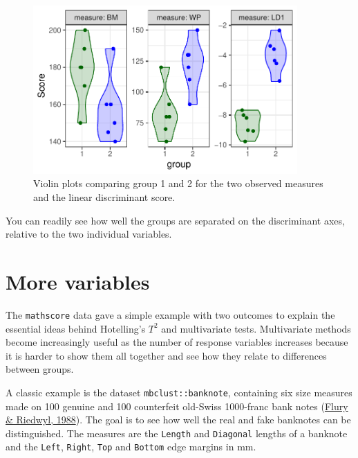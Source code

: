 \documentclass[
  letterpaper,
  10pt,
  krantz2]{krantz}
\begin{document}
\begin{figure}[H]

{\centering \includegraphics[width=0.9\textwidth,height=\textheight]{figs/fig-mathscore-violins-1.pdf}

}

\caption{\label{fig-mathscore-violins}Violin plots comparing group 1 and
2 for the two observed measures and the linear discriminant score.}

\end{figure}

You can readily see how well the groups are separated on the
discriminant axes, relative to the two individual variables.

\hypertarget{more-variables}{%
\section{More variables}\label{more-variables}}

The \texttt{mathscore} data gave a simple example with two outcomes to
explain the essential ideas behind Hotelling's \(T^2\) and multivariate
tests. Multivariate methods become increasingly useful as the number of
response variables increases because it is harder to show them all
together and see how they relate to differences between groups.

A classic example is the dataset \texttt{mbclust::banknote}, containing
six size measures made on 100 genuine and 100 counterfeit old-Swiss
1000-franc bank notes (\protect\hyperlink{ref-FluryReidwyl-1988}{Flury
\& Riedwyl, 1988}). The goal is to see how well the real and fake
banknotes can be distinguished. The measures are the \texttt{Length} and
\texttt{Diagonal} lengths of a banknote and the \texttt{Left},
\texttt{Right}, \texttt{Top} and \texttt{Bottom} edge margins in mm.
\end{document}
